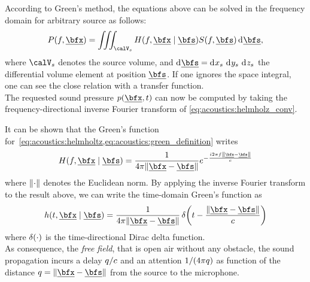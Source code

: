 According to Green's method, the equations above can be solved in the frequency domain for arbitrary source as follows:
\begin{equation}
    \label{eq:acoustics:helmholz_conv}
    P(f, \positionMicrophone) = \iiint_{\volume_\contSource} H(f, \positionMicrophone \mid \positionSource) S(f, \positionSource) \kdiff\positionSource
    ,
\end{equation}
where $\volume_\contSource$ denotes the source volume,
and  $\kdiff\positionSource =  \kdiff{x_\contSource}\,\kdiff{y_\contSource}\,\kdiff{z_\contSource}$ the  differential  volume element at position $\positionSource$.
If one ignores the space integral, one can see the close relation with a transfer function.
\\The requested sound pressure $\pressureSpaceTime$ can now be computed by taking the frequency-directional inverse Fourier transform of \cref{eq:acoustics:helmholz_conv}.

It can be shown  that the Green's function for~\cref{eq:acoustics:helmholtz,eq:acoustics:green_definition} writes
\begin{equation}
    \label{eq:acoustics:greenFreeFreq}
    H(f, \positionMicrophone \mid \positionSource) = \frac{1}{4 \pi \norm{\positionMicrophone - \positionSource}} \cste^{- \frac{\csti 2 \pi f \norm{\positionMicrophone - \positionSource}}{\speedOfSound}}
\end{equation}
where $\norm{\cdot}$ denotes the Euclidean norm.
By applying the inverse Fourier transform to the result above, we can write the time-domain Green's function as
\begin{equation}
    \label{eq:acoustics:greenFreeTime}
    h(t, \positionMicrophone \mid \positionSource) =
        \frac{1}{4 \pi \norm{\positionMicrophone - \positionSource}}
        \diracOf{t - \frac{\norm{\positionMicrophone - \positionSource}}{\speedOfSound}}
\end{equation}
where $\diracOf{\cdot}$ is the time-directional Dirac delta function.
\\As consequence, the \textit{free field}, that is open air without any obstacle, the  sound propagation incurs a delay $q / c$
and an attention $1 / (4 \pi q)$ as function of the distance
$ \distMicSrc = \norm{\positionMicrophone - \positionSource}$ from the source to the microphone.


